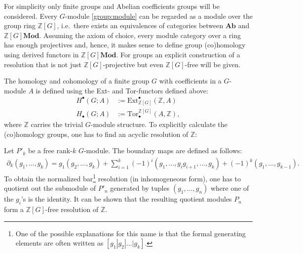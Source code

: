 	For simplicity only finite groups and Abelian coefficients groups will be considered. Every $G$-module \ref{group:module} can be regarded as a module over the group ring $\mathbb{Z}[G]$, i.e.~there exists an equivalences of categories between $\mathbf{Ab}$ and $\mathbb{Z}[G]\mathbf{Mod}$. Assuming the axiom of choice, every module category over a ring has enough projectives and, hence, it makes sense to define group (co)homology using derived functors in $\mathbb{Z}[G]\mathbf{Mod}$. For groups an explicit construction of a resolution that is not just $\mathbb{Z}[G]$-projective but even $\mathbb{Z}[G]$-free will be given.

	The homology and cohomology of a finite group $G$ with coefficients in a $G$-module $A$ is defined using the Ext- and Tor-functors defined above:
	\begin{align}
		H^\bullet(G; A) &:= \text{Ext}_{\mathbb{Z}[G]}^\bullet(\mathbb{Z}, A)\\
		H_\bullet(G; A) &:= \text{Tor}^{\mathbb{Z}[G]}_\bullet(A, \mathbb{Z}),
	\end{align}
	where $\mathbb{Z}$ carries the trivial $G$-module structure. To explicitly calculate the (co)homology groups, one has to find an acyclic resolution of $\mathbb{Z}$:
	\begin{construct}
		Let $P'_k$ be a free rank-$k$ $G$-module. The boundary maps are defined as follows:
		\begin{gather}
			\label{homalg:group_boundary}
			\partial_k(g_1,\ldots,g_k) = g_1(g_2,\ldots,g_k) + \sum_{i=1}^k (-1)^i(g_1,\ldots,g_ig_{i+1},\ldots,g_k) + (-1)^k (g_1,\ldots,g_{k-1}).
		\end{gather}
		To obtain the normalized bar\footnote{One of the possible explanations for this name is that the formal generating elements are often written as $[g_1|g_2|\ldots|g_k]$.} resolution (in inhomogeneous form), one has to quotient out the submodule of $P'_n$ generated by tuples $(g_1,\ldots,g_n)$ where one of the $g_i$'s is the identity. It can be shown that the resulting quotient modules $P_n$ form a $\mathbb{Z}[G]$-free resolution of $\mathbb{Z}$.
	\end{construct}

